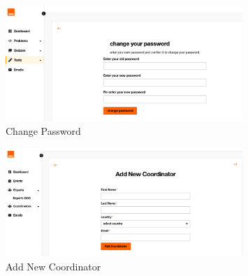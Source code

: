 \begin{figure}[h!]
  \centering
  \includegraphics[width=0.8\textwidth, height=0.3\textheight]{images/odc-change-password.png}
  \caption{Change Password}
\end{figure}

\begin{figure}[h!]
  \centering
  \includegraphics[width=0.8\textwidth, height=0.3\textheight]{images/odc-add-new-coordinator.png}
  \caption{Add New Coordinator}
\end{figure}
